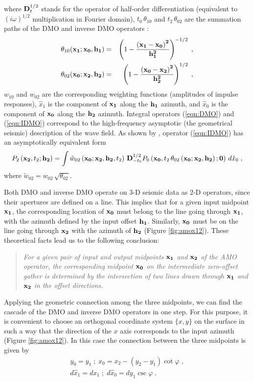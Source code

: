 where ${\bf D}_t^{1/2}$ stands for the operator of half-order differentiation
(equivalent to $(i \omega)^{1/2}$ multiplication in Fourier domain),
$t_0\, \theta_{10}$ and $t_2\,\theta_{02}$ are the summation paths of
the DMO and inverse DMO  
operators \cite[]{GPR29-03-03740406}:
\begin{eqnarray}
\theta_{10}({\bf x_1;x_0, h_1}) & = &
\left(1-{\bf \left(x_1-x_0\right)^2 \over h_1^2}\right)^{-1/2}\;,
\label{eqn:DMOtt}\\
\theta_{02}({\bf x_0;x_2, h_2}) & = &
\left(1-{\bf \left(x_0-x_2\right)^2 \over h_2^2}\right)^{1/2}\;,
\label{eqn:IDMOtt}
\end{eqnarray}
$w_{10}$ and $w_{02}$ are the corresponding weighting functions (amplitudes of
impulse responses), $\hat{x}_1$ is the component of ${\bf x_1}$ along the
${\bf h_1}$ azimuth, and $\hat{x}_0$ is the component of ${\bf x_0}$
along the
${\bf h_2}$ azimuth. 
Integral operators (\ref{eqn:DMO}) and (\ref{eqn:IDMO}) correspond to
the high-frequency asymptotic (the geometrical seismic) description of
the wave field. As shown by \cite{myDMO}, 
operator (\ref{eqn:IDMO}) has an asymptotically equivalent
form
\begin{equation}
P_2\left({\bf x_2},t_2;{\bf h_2}\right)=\int 
\tilde{w}_{02}\left({\bf x_0;x_2, h_2},t_2\right)\,
{\bf D}_{-t_0}^{1/2}P_0\left({\bf x_0},t_2\,\theta_{02}
\left({\bf x_0;x_2, h_2}\right);
{\bf 0}\right)\,d\hat{x}_0\;,
\label{eqn:tIDMO}
\end{equation}
where $\tilde{w}_{02}=w_{02}\,\sqrt{\theta_{02}}$.
\par
Both DMO and inverse DMO operate on 3-D seismic data
as 2-D operators, since their apertures are defined on a line. This
implies that for a given input midpoint ${\bf x_1}$, the corresponding
location of ${\bf x_0}$ must belong to the
line going through ${\bf x_1}$, with the azimuth defined by the input
offset ${\bf h_1}$. 
Similarly, ${\bf x_0}$ must be on the line going through 
${\bf x_2}$ with the azimuth of ${\bf h_2}$ (Figure \ref{fig:amox12}).
These theoretical facts lead us to the following conclusion: 
\begin{quote}
{\em For a given pair of input and output midpoints ${\bf x_1}$ and ${\bf x_2}$
of the AMO operator, the corresponding midpoint ${\bf x_0}$ on
the intermediate zero-offset gather is determined by the  intersection of 
two lines drawn
through ${\bf x_1}$ and ${\bf x_2}$
in the offset directions.} 
\end{quote}
Applying the geometric connection among the three midpoints, we can
find the cascade 
of the DMO
and inverse DMO operators in one step.
For this purpose, it is convenient to choose an orthogonal coordinate
system $\{x,y\}$ on the 
surface in such a way that the direction of the $x$ axis corresponds
to the input azimuth 
(Figure \ref{fig:amox12}).
In this case the connection between the three midpoints is given by
\begin{eqnarray}
y_0=y_1\;;\;x_0=x_2-\left(y_2-y_1\right) \cot{\varphi}\;,
\label{eqn:x012}\\
d\hat{x}_1=dx_1\;;\;d\hat{x}_0=dy_1 \csc{\varphi}\;.
\label{eqn:jacob}
\end{eqnarray}

